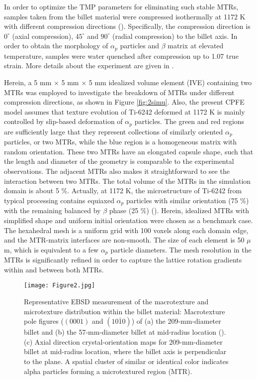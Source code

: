 \documentclass[review]{elsarticle}
\begin{document}
	In order to optimize the TMP parameters for eliminating such stable MTRs, samples taken from the billet material were compressed isothermally at 1172 K with different compression directions (\cite{r26}).
	Specifically, the compression direction is $0^{\circ}$ (axial compression), $45^{\circ}$ and $90^{\circ}$ (radial compression) to the billet axis.
	In order to obtain the morphology of $\alpha_p$ particles and $\beta$ matrix at elevated temperature, samples were water quenched after compression up to 1.07 true strain.
	More details about the experiment are given in \cite{r26}.

	Herein, a 5 mm $\times$ 5 mm $\times$ 5 mm idealized volume element (IVE) containing two MTRs was employed to investigate the breakdown of MTRs under different compression directions, as shown in Figure \ref{fig:2simu}.
	Also, the present CPFE model assumes that texture evolution of Ti-6242 deformed at 1172 K is mainly controlled by slip-based deformation of $\alpha_p$ particles.
	The green and red regions are sufficiently large that they represent collections of similarly oriented $\alpha_p$ particles, or two MTRs, while the blue region is a homogeneous matrix with random orientation.
	These two MTRs have an elongated capsule shape, such that the length and diameter of the geometry is comparable to the experimental observations.
	The adjacent MTRs also makes it straightforward to see the interaction between two MTRs.
	The total volume of the MTRs in the simulation domain is about 5 \%.
	Actually, at 1172 K, the microstructure of Ti-6242 from typical processing contains equiaxed $\alpha _p$ particles with similar orientation (75 \%) with the remaining balanced by $\beta$ phase (25 \%) (\cite{r26}).
	Herein, idealized MTRs with simplified shape and uniform initial orientation were chosen as a benchmark case.
	The hexahedral mesh is a uniform grid with 100 voxels along each domain edge, and the MTR-matrix interfaces are non-smooth.
	The size of each element is 50 $\mu$m, which is equivalent to a few $\alpha_p$ particle diameters.
	The mesh resolution in the MTRs is significantly refined in order to capture the lattice rotation gradients within and between both MTRs.
	\begin{figure}[!htb]
	\centering
	\texttt{[image: Figure2.jpg]}
	\caption{\label{fig:2}Representative EBSD measurement of the macrotexture and microtexture distribution within the billet material:
      Macrotexture pole figures ($(0001)$ and $(10\bar{1}0)$) of (a) the 209-mm-diameter billet and (b) the 57-mm-diameter billet at mid-radius location (\cite{r5}).
      (c) Axial direction crystal-orientation maps for 209-mm-diameter billet at mid-radius location, where the billet axis is perpendicular to the plane.
      A spatial cluster of similar or identical color indicates alpha particles forming a microtextured region (MTR).}
	\end{figure}
\end{document}
